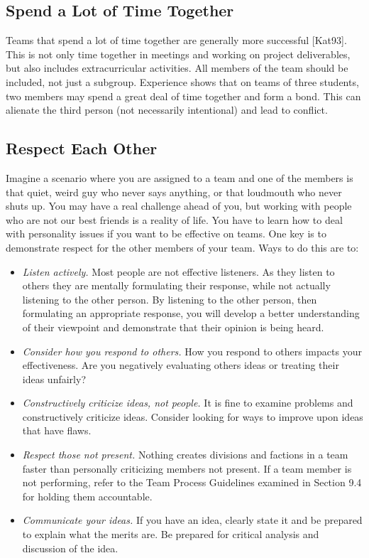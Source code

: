 \subsection{Spend a Lot of Time Together}
\label{subsection:spend-a-lot-of-time-together}

Teams that spend a lot of time together are generally more successful
{[}Kat93{]}. This is not only time together in meetings and working on
project deliverables, but also includes extracurricular activities. All
members of the team should be included, not just a subgroup. Experience
shows that on teams of three students, two members may spend a great
deal of time together and form a bond. This can alienate the third
person (not necessarily intentional) and lead to conflict.

\subsection{Respect Each Other}
\label{subsection:respect-each-other}

Imagine a scenario where you are assigned to a team and one of the
members is that quiet, weird guy who never says anything, or that
loudmouth who never shuts up. You may have a real challenge ahead of
you, but working with people who are not our best friends is a reality
of life. You have to learn how to deal with personality issues if you
want to be effective on teams. One key is to demonstrate respect for the
other members of your team. Ways to do this are to:

\begin{itemize}
\item
  \emph{Listen actively.} Most people are not effective listeners. As
  they listen to others they are mentally formulating their response,
  while not actually listening to the other person. By listening to the
  other person, then formulating an appropriate response, you will
  develop a better understanding of their viewpoint and demonstrate that
  their opinion is being heard.
\item
  \emph{Consider how you respond to others.} How you respond to others
  impacts your effectiveness. Are you negatively evaluating others ideas
  or treating their ideas unfairly?
\item
  \emph{Constructively criticize ideas, not people.} It is fine to
  examine problems and constructively criticize ideas. Consider looking
  for ways to improve upon ideas that have flaws.
\item
  \emph{Respect those not present.} Nothing creates divisions and
  factions in a team faster than personally criticizing members not
  present. If a team member is not performing, refer to the Team Process
  Guidelines examined in Section 9.4 for holding them accountable.
\item
  \emph{Communicate your ideas.} If you have an idea, clearly state it
  and be prepared to explain what the merits are. Be prepared for
  critical analysis and discussion of the idea.
\end{itemize}

